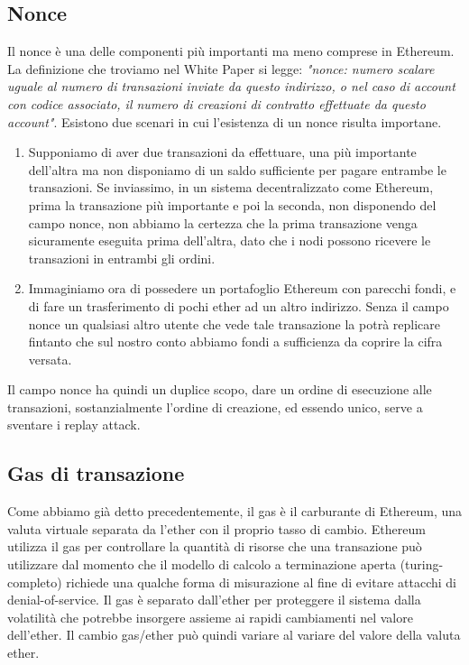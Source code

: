 \subsection*{Nonce}
Il nonce è una delle componenti più importanti ma meno comprese in Ethereum. La definizione che troviamo nel White Paper si legge: \textit{"nonce: numero scalare uguale al numero di transazioni inviate da questo indirizzo, o nel caso di account con codice associato, il numero di creazioni di contratto effettuate da questo account"}. Esistono due scenari in cui l'esistenza di un nonce risulta importane.
\begin{enumerate}
	\item Supponiamo di aver due transazioni da effettuare, una più importante dell'altra ma non disponiamo di un saldo sufficiente per pagare entrambe le transazioni. Se inviassimo, in un sistema decentralizzato come Ethereum, prima la transazione più importante e poi la seconda, non disponendo del campo nonce, non abbiamo la certezza che la prima transazione venga sicuramente eseguita prima dell'altra, dato che i nodi possono ricevere le transazioni in entrambi gli ordini.
	\item Immaginiamo ora di possedere un portafoglio Ethereum con parecchi fondi, e di fare un trasferimento di pochi ether ad un altro indirizzo. Senza il campo nonce un qualsiasi altro utente che vede tale transazione la potrà replicare fintanto che sul nostro conto abbiamo fondi a sufficienza da coprire la cifra versata.
\end{enumerate}
Il campo nonce ha quindi un duplice scopo, dare un ordine di esecuzione alle transazioni, sostanzialmente l'ordine di creazione, ed essendo unico, serve a sventare i replay attack.

\subsection{Gas di transazione}
Come abbiamo già detto precedentemente, il gas è il carburante di Ethereum, una valuta virtuale separata da l'ether con il proprio tasso di cambio. Ethereum utilizza il gas per controllare la quantità di risorse che una transazione può utilizzare dal momento che il modello di calcolo a terminazione aperta (turing-completo) richiede una qualche forma di misurazione al fine di evitare attacchi di denial-of-service. Il gas è separato dall'ether per proteggere il sistema dalla volatilità che potrebbe insorgere assieme ai rapidi cambiamenti nel valore dell'ether. Il cambio gas/ether può quindi variare al variare del valore della valuta ether. 

